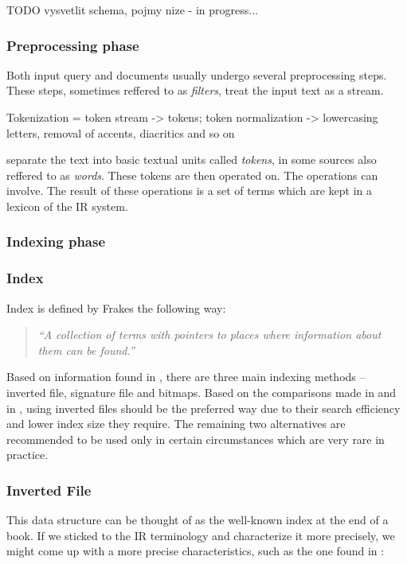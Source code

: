 TODO vysvetlit schema, pojmy nize - in progress...

\subsubsection{Preprocessing phase}

Both input query and documents usually undergo several preprocessing steps. These steps, sometimes reffered to as \textsl{filters},   
treat the input text as a stream. 

Tokenization = token stream -> tokens; token normalization -> lowercasing letters, removal of accents, diacritics and so on

separate the text into basic textual units called \textsl{tokens}, in some sources also reffered to as \textsl{words}. These tokens are then operated on. The operations can involve. The result of these operations is a set of terms which are kept in a lexicon of the IR system. 

\subsubsection{Indexing phase}

\subsubsection*{Index}

Index is defined by Frakes \cite{IRDataAlgorithms} the following way: 
	\begin{quote}
	\textsl{``A collection of terms with pointers to places where information about them can be found.''} 	
	\end{quote}
Based on information found in \cite{ManningRaghavanSchuetze08, IRDataAlgorithms, Witten:1999:MGC:323905}, there are three main indexing methods – inverted file, signature file and bitmaps. Based on the comparisons made in \cite{Witten:1999:MGC:323905} and in \cite{Zobel:1996:GPC:234889.234891}, using inverted files should be the preferred way due to their search efficiency and lower index size they require. The remaining two alternatives are recommended to be used only in certain circumstances which are very rare in practice. 

\subsubsection*{Inverted File}

This data structure can be thought of as the well-known index at the end of a book. If we sticked to the IR terminology and characterize it more precisely, we might come up with a more precise characteristics, such as the one found in \cite{Witten:1999:MGC:323905}:

